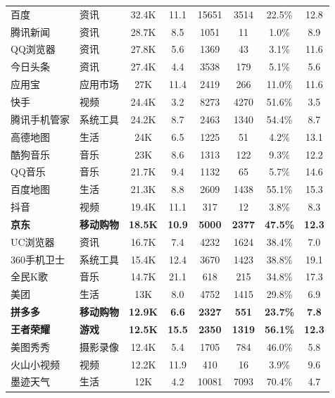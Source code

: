\begin{ThreePartTable}
\begin{longtable}{l l c c c c c c}
\rowcolor{gray!15} 百度 & 资讯 & 32.4K & 11.1 & 15651 & 3514 & 22.5\% & 12.8 \\
腾讯新闻 & 资讯 & 28.7K & 8.5 & 1051 & 11 & 1.0\% & 8.9 \\
\rowcolor{gray!15} QQ浏览器 & 资讯 & 27.8K & 5.6 & 1369 & 43 & 3.1\% & 11.6 \\
今日头条 & 资讯 & 27.4K & 4.4 & 3538 & 179 & 5.1\% & 5.6 \\
\rowcolor{gray!15} 应用宝 & 应用市场 & 27K & 11.4 & 2419 & 266 & 11.0\% & 11.6 \\
快手 & 视频 & 24.4K & 3.2 & 8273 & 4270 & 51.6\% & 3.5 \\
\rowcolor{gray!15} 腾讯手机管家 & 系统工具 & 24.2K & 8.7 & 2463 & 1340 & 54.4\% & 8.7 \\
高德地图 & 生活 & 24K & 6.5 & 1225 & 51 & 4.2\% & 13.1 \\
\rowcolor{gray!15} 酷狗音乐 & 音乐 & 23K & 8.6 & 1313 & 122 & 9.3\% & 12.2 \\
QQ音乐 & 音乐 & 21.7K & 9.4 & 1132 & 65 & 5.7\% & 14.6 \\
\rowcolor{gray!15} 百度地图 & 生活 & 21.3K & 8.8 & 2609 & 1438 & 55.1\% & 15.3 \\
抖音 & 视频 & 19.4K & 11.1 & 317 & 12 & 3.8\% & 8.3 \\
\rowcolor{gray!15} {\bf 京东}\tnote{*} & {\bf 移动购物} & {\bf 18.5K} & {\bf 10.9} & {\bf 5000} & {\bf 2377} & {\bf 47.5\%} & {\bf 12.3} \\
UC浏览器 & 资讯 & 16.7K & 7.4 & 4232 & 1624 & 38.4\% & 7.0 \\
\rowcolor{gray!15} 360手机卫士 & 系统工具 & 15.4K & 12.4 & 3670 & 1423 & 38.8\% & 19.1 \\
全民K歌 & 音乐 & 14.7K & 21.1 & 618 & 215 & 34.8\% & 17.3 \\
\rowcolor{gray!15} 美团 & 生活 & 13K & 8.0 & 4752 & 1415 & 29.8\% & 6.9 \\
{\bf 拼多多}\tnote{*} & {\bf 移动购物} & {\bf 12.9K} & {\bf 6.6} & {\bf 2327} & {\bf 551} & {\bf 23.7\%} & {\bf 7.8} \\
\rowcolor{gray!15} {\bf 王者荣耀}\tnote{*} & {\bf 游戏} & {\bf 12.5K} & {\bf 15.5} & {\bf 2350} & {\bf 1319} & {\bf 56.1\%} & {\bf 12.3} \\
美图秀秀 & 摄影录像 & 12.4K & 5.4 & 1705 & 784 & 46.0\% & 5.8 \\
\rowcolor{gray!15} 火山小视频 & 视频 & 12.2K & 11.9 & 410 & 16 & 3.9\% & 9.6 \\
墨迹天气 & 生活 & 12K & 4.2 & 10081 & 7093 & 70.4\% & 4.7 \\

\end{longtable}
\end{ThreePartTable}
